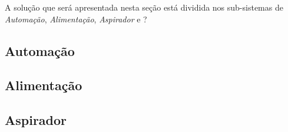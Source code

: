 A solução que será apresentada nesta seção está dividida nos sub-sistemas de \textit{Automação}, \textit{Alimentação}, \textit{Aspirador} e ?

\subsection{Automação} %
\label{sub:automação}


\subsection{Alimentação} %
\label{sub:alimentação}


\subsection{Aspirador} %
\label{sub:aspirador}

